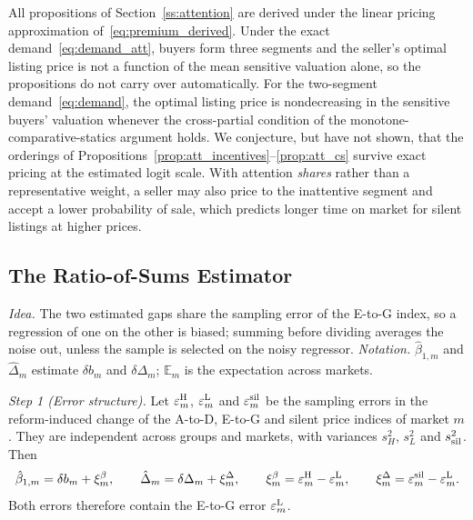All propositions of Section~\ref{ss:attention} are derived under the linear pricing approximation of~\eqref{eq:premium_derived}. Under the exact demand~\eqref{eq:demand_att}, buyers form three segments and the seller's optimal listing price is not a function of the mean sensitive valuation alone, so the propositions do not carry over automatically. For the two-segment demand~\eqref{eq:demand}, the optimal listing price is nondecreasing in the sensitive buyers' valuation whenever the cross-partial condition of the monotone-comparative-statics argument holds. We conjecture, but have not shown, that the orderings of Propositions~\ref{prop:att_incentives}--\ref{prop:att_cs} survive exact pricing at the estimated logit scale. With attention \emph{shares} rather than a representative weight, a seller may also price to the inattentive segment and accept a lower probability of sale, which predicts longer time on market for silent listings at higher prices.

\subsection*{The Ratio-of-Sums Estimator}
\label{app:att_estimator}

\noindent\emph{Idea.} The two estimated gaps share the sampling error of the E-to-G index, so a regression of one on the other is biased; summing before dividing averages the noise out, unless the sample is selected on the noisy regressor. \emph{Notation.} $\hat\beta_{1,m}$ and $\hat\Delta_m$ estimate $\delta b_m$ and $\delta\Delta_m$; $\mathbb E_m$ is the expectation across markets.

\emph{Step 1 (Error structure).} Let $\varepsilon^{\rm H}_m$, $\varepsilon^{\rm L}_m$ and $\varepsilon^{\rm sil}_m$ be the sampling errors in the reform-induced change of the A-to-D, E-to-G and silent price indices of market $m$. They are independent across groups and markets, with variances $s_H^2$, $s_L^2$ and $s_{\rm sil}^2$. Then
\begin{equation*}
    \hat\beta_{1,m}=\delta b_m+\xi^{\beta}_m,\qquad \hat\Delta_m=\delta\Delta_m+\xi^{\Delta}_m,\qquad \xi^{\beta}_m=\varepsilon^{\rm H}_m-\varepsilon^{\rm L}_m,\qquad \xi^{\Delta}_m=\varepsilon^{\rm sil}_m-\varepsilon^{\rm L}_m.
\end{equation*}
Both errors therefore contain the E-to-G error $\varepsilon^{\rm L}_m$.

